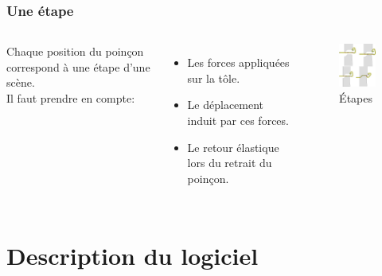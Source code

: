 \documentclass{beamer}
\begin{document}
\begin{frame}
    \frametitle{Une étape}
    \begin{columns}
        Chaque position du poinçon correspond à une étape d'une scène.\\
        Il faut prendre en compte:
        \begin{itemize}
            \item Les forces appliquées sur la tôle.
            \item Le déplacement induit par ces forces.
            \item Le retour élastique lors du retrait du poinçon.
        \end{itemize}
        \begin{figure}
            \includegraphics[width=\textwidth]{img/etape.jpg}
            \caption{Étapes}
            \label{Étape}
        \end{figure}
    \end{columns}
\end{frame}

\section{Description du logiciel}
\end{document}
